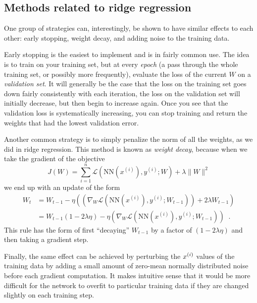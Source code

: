 \subsection{Methods related to ridge regression}

One group of strategies can, interestingly, be shown to have similar
effects to each other: early stopping, weight decay, and adding noise
to the training data. 

Early stopping is the easiest to implement and is in fairly common
use.  The idea is to train on your training set, but at every {\em
    epoch} (a pass through the whole training set, or possibly more
frequently), evaluate the loss of the current $W$ on a {\em validation
    set}.  It will generally be the case that the loss on the training
set goes down fairly consistently with each iteration, the loss on the
validation set will initially decrease, but then begin to increase
again.  Once you see that the validation loss is systematically
increasing, you can stop training and return the weights that had the
lowest validation error.

Another common strategy is to simply penalize the norm of all the
weights, as we did in ridge regression.  This  method is known as {\em
    weight decay}, because when we take the gradient of the objective
$$ J(W) = \sum_{i = 1}^{n}\mathcal{L}(\text{NN}(x^{(i)}), y^{(i)}; W)
  + \lambda\|W\|^2 $$
we end up  with an update of the form
\begin{align*}
  W_t & = W_{t-1} -
  \eta\left(\left(\nabla_{W}\mathcal{L}(\text{NN}(x^{(i)}),
  y^{(i)}; W_{t-1})\right) + 2\lambda W_{t-1}\right)                                      \\
      & = W_{t-1}(1 - 2\lambda\eta) - \eta\left(\nabla_{W}\mathcal{L}(\text{NN}(x^{(i)}),
    y^{(i)}; W_{t-1})\right) \;\;.
\end{align*}
This rule has the form of first ``decaying'' $W_{t-1}$ by a factor of
$(1 - 2 \lambda \eta)$ and then taking a gradient step.

Finally, the same effect can be achieved by perturbing the $x^{(i)}$
values of the training data by adding a small amount of zero-mean
normally distributed noise before each gradient computation.  It makes
intuitive sense that it would be more difficult for the network to
overfit to particular training data if they are changed slightly on
each training step.

